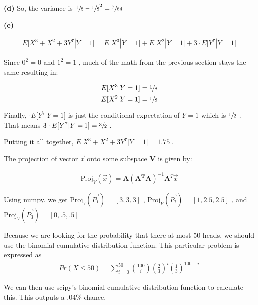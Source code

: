 \documentclass[12pt]{article}
\newenvironment{problem}[2][Problem]{\begin{trivlist}
\item[\hskip \labelsep {\bfseries #1}\hskip \labelsep {\bfseries #2.}]}{\end{trivlist}}
\newenvironment{subproblem}[1]{\textbf{(#1)}}{}
\theoremstyle{definition}
\begin{document}
\begin{problem}{1}
\begin{subproblem}{d}
So, the variance is $ \displaystyle \sfrac{1}{8} - \sfrac{1}{8} ^ 2 = \sfrac{7}{64} $

\end{subproblem}

\begin{subproblem}{e}

\begin{align*}
E \lbrack X^3 + X^2 + 3Y^7 | Y = 1 \rbrack = E \lbrack X^3 | Y=1 \rbrack + E \lbrack X^2 | Y=1  \rbrack + 3 \cdot E \lbrack Y^7 | Y=1  \rbrack
\end{align*}

Since $ 0^2 = 0 $ and $ 1^2 =1 $ , much of the math from the previous section stays the same resulting in:

\begin{align*}
E \lbrack X^3 | Y=1 \rbrack = \sfrac{1}{8} \\
E \lbrack X^2 | Y=1  \rbrack = \sfrac{1}{8}
\end{align*}

Finally, $ \cdot E \lbrack Y^7 | Y=1  \rbrack $ is just the conditional expectation of $ Y = 1 $ which is $ \sfrac{1}{2} $ .
That means $  3 \cdot E \lbrack Y^7 | Y=1  \rbrack = \sfrac{3}{2} $ .

Putting it all together, $  E \lbrack X^3 + X^2 + 3Y^7 | Y = 1 \rbrack = 1.75 $ .


\end{subproblem}
\end{problem}

\begin{problem}{2}
The projection of vector $ \vec{x} $ onto some subspace $ \textbf{V} $ is given by:

\begin{align}
\text{Proj}_V(\vec{x}) = \boldsymbol{A}(\boldsymbol{A^T}\boldsymbol{A})^{-1}\boldsymbol{A}^T\vec{x}
\end{align}

Using numpy, we get $ \text{Proj}_V(\vec{P_1}) = [3,3,3] $ , $ \text{Proj}_V(\vec{P_2}) = [1,2.5,2.5] $ , and $ \text{Proj}_V(\vec{P_3}) = [0,.5,.5] $

\end{problem}

\begin{problem}{3}
Because we are looking for the probability that there at most 50 heads, we should use the binomial cumulative distribution function.
This particular problem is expressed as
\begin{align*}
Pr(X\leq50) = \sum^{50}_{i=0} \binom{100}{i}(\frac{2}{3})^i(\frac{1}{3})^{100-i}
\end{align*}

We can then use scipy's binomial cumulative distribution function to calculate this.
This outputs a .04\% chance.
\end{problem}
\end{document}

